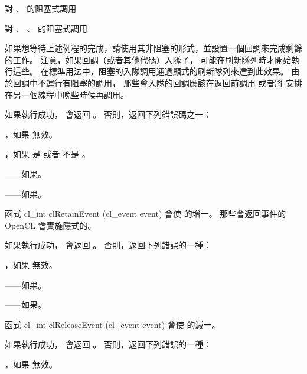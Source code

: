\item 對 、  的阻塞式調用

\item 對 、 、  的阻塞式調用
\stopigBase

如果想等待上述例程的完成，請使用其非阻塞的形式，並設置一個回調來完成剩餘的工作。
注意，如果回調（或者其他代碼）入隊了，
可能在刷新隊列時才開始執行這些。
在標準用法中，阻塞的入隊調用通過顯式的刷新隊列來達到此效果。
由於回調中不運行有阻塞的調用，
那些會入隊的回調應該在返回前調用 
 或者將  安排在另一個線程中晚些時候再調用。

如果執行成功，  會返回 。
否則，返回下列錯誤碼之一：
\startigBase
\item {}，如果  無效。

\item {}，如果  是 
 或者  不是 。

\item {}——如果\scdevfailres。

\item {}——如果\schostfailres。
\stopigBase

函式
\startclc
cl_int clRetainEvent (cl_event event)
\stopclc
會使  的增一。
那些會返回事件的 OpenCL 會實施隱式的。

如果執行成功，  會返回 。
否則，返回下列錯誤的一種：
\startigBase
\item {}，如果  無效。

\item {}——如果\scdevfailres。

\item {}——如果\schostfailres。
\stopigBase

函式
\startclc
cl_int clReleaseEvent (cl_event event)
\stopclc
會使  的減一。

如果執行成功，  會返回 。
否則，返回下列錯誤的一種：
\startigBase
\item {}，如果  無效。

